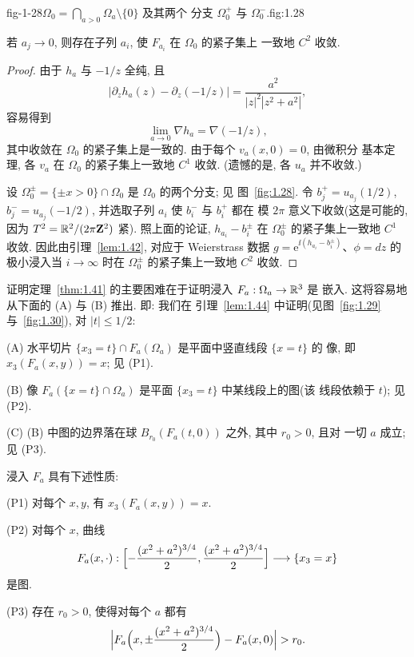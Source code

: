   {fig-1-28}{$\Omega_0=\bigcap_{a>0}\Omega_a\setminus\{0\}$ 及其两个
   分支 $\Omega_0^+$ 与 $\Omega_0^-$.}{fig:1.28}

\begin{lemma}
\label{lem:1.43}
若 $a_j\to0$, 则存在子列 $a_i$, 使 $F_{a_i}$ 在 $\Omega_0$ 的紧子集上
一致地 $C^{2}$ 收敛.
\end{lemma}

\begin{proof}
由于 $h_a$ 与 $-1/z$ 全纯, 且
\begin{equation}
\bigl|\partial_z h_a(z)-\partial_z(-1/z)\bigr|
 =\frac{a^{2}}{|z|^{2}|z^{2}+a^{2}|},
\label{eq:1.214}
\end{equation}
容易得到
\begin{equation}
\lim_{a\to0}\nabla h_a=\nabla(-1/z),
\label{eq:1.215}
\end{equation}
其中收敛在 $\Omega_0$ 的紧子集上是一致的. 由于每个 $v_a(x,0)=0$, 由微积分
基本定理, 各 $v_a$ 在 $\Omega_0$ 的紧子集上一致地 $C^{1}$ 收敛. (遗憾的是,
各 $u_a$ 并不收敛.)

设 $\Omega_0^{\pm}=\{\pm x>0\}\cap\Omega_0$ 是 $\Omega_0$ 的两个分支; 见
图~\ref{fig:1.28}. 令 $b_j^{+}=u_{a_j}(1/2)$,
$b_j^{-}=u_{a_j}(-1/2)$, 并选取子列 $a_i$ 使 $b_i^{-}$ 与 $b_i^{+}$ 都在
模 $2\pi$ 意义下收敛(这是可能的, 因为
$T^{2}=\mathbb{R}^{2}/(2\pi\mathbf{Z}^{2})$ 紧). 照上面的论证,
$h_{a_i}-b_i^{\pm}$ 在 $\Omega_0^{\pm}$ 的紧子集上一致地 $C^{1}$ 收敛.
因此由引理~\ref{lem:1.42}, 对应于 Weierstrass 数据
$g=\mathrm{e}^{\ii(h_{a_i}-b_i^{\pm})}$、$\phi=dz$ 的极小浸入当
$i\to\infty$ 时在 $\Omega_0^{\pm}$ 的紧子集上一致地 $C^{2}$ 收敛.
\end{proof}

证明定理~\ref{thm:1.41} 的主要困难在于证明浸入 $F_a:\Omega_a\to\mathbb{R}^3$ 是
嵌入. 这将容易地从下面的 (A) 与 (B) 推出. 即: 我们在
引理~\ref{lem:1.44} 中证明(见图~\ref{fig:1.29} 与~\ref{fig:1.30}), 对
$|t|\leq1/2$:

(A) 水平切片 $\{x_3=t\}\cap F_a(\Omega_a)$ 是平面中竖直线段 $\{x=t\}$ 的
像, 即 $x_3(F_a(x,y))=x$; 见 (P1).

(B) 像 $F_a(\{x=t\}\cap\Omega_a)$ 是平面 $\{x_3=t\}$ 中某线段上的图(该
线段依赖于 $t$); 见 (P2).

(C) (B) 中图的边界落在球 $B_{r_0}(F_a(t,0))$ 之外, 其中 $r_0>0$, 且对
一切 $a$ 成立; 见 (P3).


\begin{lemma}
\label{lem:1.44}
浸入 $F_a$ 具有下述性质:

(P1) 对每个 $x,y$, 有 $x_3(F_a(x,y))=x$.

(P2) 对每个 $x$, 曲线
\[
F_a(x,\cdot):
\Bigl[-\frac{(x^{2}+a^{2})^{3/4}}{2},
 \frac{(x^{2}+a^{2})^{3/4}}{2}\Bigr]\longrightarrow\{x_3=x\}
\]
是图.

(P3) 存在 $r_0>0$, 使得对每个 $a$ 都有
\[
\Bigl|F_a\Bigl(x,\pm\frac{(x^{2}+a^{2})^{3/4}}{2}\Bigr)
 -F_a(x,0)\Bigr|>r_0.
\]
\end{lemma}


